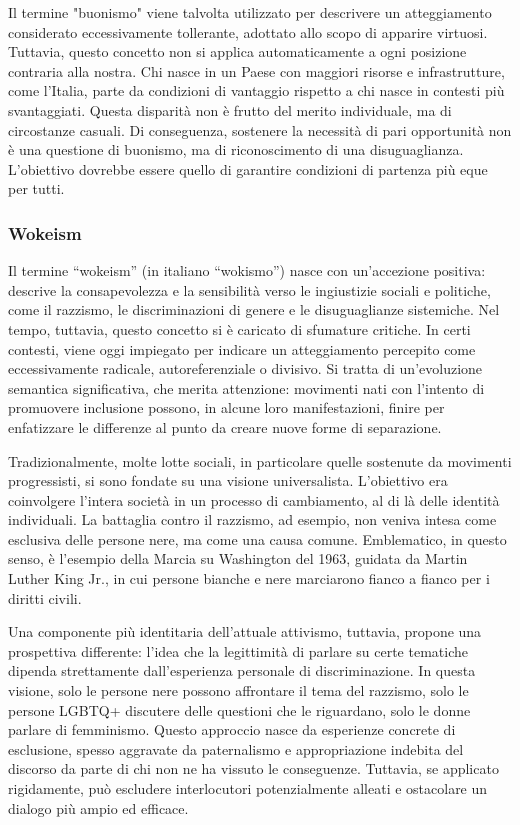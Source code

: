 \documentclass[12pt]{book} %
\begin{document}
\begin{mdframed}[linewidth=1pt]
Il termine "buonismo" viene talvolta utilizzato per descrivere un atteggiamento considerato eccessivamente tollerante, adottato allo scopo di apparire virtuosi. Tuttavia, questo concetto non si applica automaticamente a ogni posizione contraria alla nostra. Chi nasce in un Paese con maggiori risorse e infrastrutture, come l’Italia, parte da condizioni di vantaggio rispetto a chi nasce in contesti più svantaggiati. Questa disparità non è frutto del merito individuale, ma di circostanze casuali. Di conseguenza, sostenere la necessità di pari opportunità non è una questione di buonismo, ma di riconoscimento di una disuguaglianza. L’obiettivo dovrebbe essere quello di garantire condizioni di partenza più eque per tutti.
\end{mdframed}

\subsubsection{Wokeism}
Il termine “wokeism” (in italiano “wokismo”) nasce con un’accezione positiva: descrive la consapevolezza e la sensibilità verso le ingiustizie sociali e politiche, come il razzismo, le discriminazioni di genere e le disuguaglianze sistemiche. Nel tempo, tuttavia, questo concetto si è caricato di sfumature critiche. In certi contesti, viene oggi impiegato per indicare un atteggiamento percepito come eccessivamente radicale, autoreferenziale o divisivo. Si tratta di un’evoluzione semantica significativa, che merita attenzione: movimenti nati con l’intento di promuovere inclusione possono, in alcune loro manifestazioni, finire per enfatizzare le differenze al punto da creare nuove forme di separazione.

Tradizionalmente, molte lotte sociali, in particolare quelle sostenute da movimenti progressisti, si sono fondate su una visione universalista. L’obiettivo era coinvolgere l’intera società in un processo di cambiamento, al di là delle identità individuali. La battaglia contro il razzismo, ad esempio, non veniva intesa come esclusiva delle persone nere, ma come una causa comune. Emblematico, in questo senso, è l’esempio della Marcia su Washington del 1963, guidata da Martin Luther King Jr., in cui persone bianche e nere marciarono fianco a fianco per i diritti civili.

Una componente più identitaria dell’attuale attivismo, tuttavia, propone una prospettiva differente: l’idea che la legittimità di parlare su certe tematiche dipenda strettamente dall’esperienza personale di discriminazione. In questa visione, solo le persone nere possono affrontare il tema del razzismo, solo le persone LGBTQ+ discutere delle questioni che le riguardano, solo le donne parlare di femminismo. Questo approccio nasce da esperienze concrete di esclusione, spesso aggravate da paternalismo e appropriazione indebita del discorso da parte di chi non ne ha vissuto le conseguenze. Tuttavia, se applicato rigidamente, può escludere interlocutori potenzialmente alleati e ostacolare un dialogo più ampio ed efficace.
\end{document}

